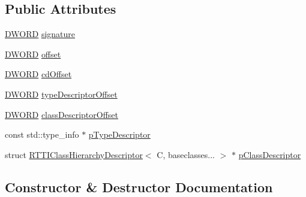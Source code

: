 \subsection*{Public Attributes}
\begin{DoxyCompactItemize}
\item 
\mbox{\hyperlink{namespacefakeit_a3d9fcff73186d3a22472ec6156db1f10}{D\+W\+O\+RD}} \mbox{\hyperlink{structfakeit_1_1RTTICompleteObjectLocator_a8886cb2d370dcaeee86f95d58246b7f3}{signature}}
\item 
\mbox{\hyperlink{namespacefakeit_a3d9fcff73186d3a22472ec6156db1f10}{D\+W\+O\+RD}} \mbox{\hyperlink{structfakeit_1_1RTTICompleteObjectLocator_a0b3ad4c837f642b303db427b81d5f8f8}{offset}}
\item 
\mbox{\hyperlink{namespacefakeit_a3d9fcff73186d3a22472ec6156db1f10}{D\+W\+O\+RD}} \mbox{\hyperlink{structfakeit_1_1RTTICompleteObjectLocator_a7d8ee13d334922b7954a09a50e125110}{cd\+Offset}}
\item 
\mbox{\hyperlink{namespacefakeit_a3d9fcff73186d3a22472ec6156db1f10}{D\+W\+O\+RD}} \mbox{\hyperlink{structfakeit_1_1RTTICompleteObjectLocator_aca65a189d0c5ef49b72d16c6dfae7818}{type\+Descriptor\+Offset}}
\item 
\mbox{\hyperlink{namespacefakeit_a3d9fcff73186d3a22472ec6156db1f10}{D\+W\+O\+RD}} \mbox{\hyperlink{structfakeit_1_1RTTICompleteObjectLocator_ab030161023e851044a5e42b164262ed8}{class\+Descriptor\+Offset}}
\item 
const std\+::type\+\_\+info $\ast$ \mbox{\hyperlink{structfakeit_1_1RTTICompleteObjectLocator_a56befc15efc88447f8ac7d7f56386e88}{p\+Type\+Descriptor}}
\item 
struct \mbox{\hyperlink{structfakeit_1_1RTTIClassHierarchyDescriptor}{R\+T\+T\+I\+Class\+Hierarchy\+Descriptor}}$<$ C, baseclasses... $>$ $\ast$ \mbox{\hyperlink{structfakeit_1_1RTTICompleteObjectLocator_a57ce7251a3aed05a28fb6f216cba979d}{p\+Class\+Descriptor}}
\end{DoxyCompactItemize}


\subsection{Constructor \& Destructor Documentation}
\mbox{\label{structfakeit_1_1RTTICompleteObjectLocator_a46c4b9221e04dae0592bd82eb29a3723}} 
